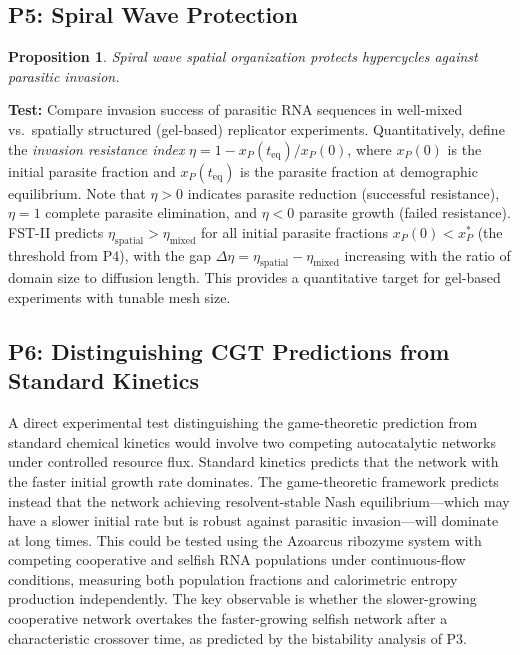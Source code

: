 \documentclass[12pt,a4paper]{article}
\newtheorem{proposition}{Proposition}
\theoremstyle{remark}
\begin{document}
\subsection{P5: Spiral Wave Protection}

\begin{proposition}
Spiral wave spatial organization protects hypercycles against parasitic invasion.
\end{proposition}

\textbf{Test:} Compare invasion success of parasitic RNA sequences in well-mixed vs.\ spatially structured (gel-based) replicator experiments. Quantitatively, define the \emph{invasion resistance index} $\eta = 1 - x_P(t_{\mathrm{eq}})/x_P(0)$, where $x_P(0)$ is the initial parasite fraction and $x_P(t_{\mathrm{eq}})$ is the parasite fraction at demographic equilibrium. Note that $\eta > 0$ indicates parasite reduction (successful resistance), $\eta = 1$ complete parasite elimination, and $\eta < 0$ parasite growth (failed resistance). FST-II predicts $\eta_{\mathrm{spatial}} > \eta_{\mathrm{mixed}}$ for all initial parasite fractions $x_P(0) < x_P^*$ (the threshold from P4), with the gap $\Delta\eta = \eta_{\mathrm{spatial}} - \eta_{\mathrm{mixed}}$ increasing with the ratio of domain size to diffusion length. This provides a quantitative target for gel-based experiments with tunable mesh size.

\subsection{P6: Distinguishing CGT Predictions from Standard Kinetics}

A direct experimental test distinguishing the game-theoretic prediction from standard chemical kinetics would involve two competing autocatalytic networks under controlled resource flux. Standard kinetics predicts that the network with the faster initial growth rate dominates. The game-theoretic framework predicts instead that the network achieving resolvent-stable Nash equilibrium---which may have a slower initial rate but is robust against parasitic invasion---will dominate at long times. This could be tested using the Azoarcus ribozyme system with competing cooperative and selfish RNA populations under continuous-flow conditions, measuring both population fractions and calorimetric entropy production independently. The key observable is whether the slower-growing cooperative network overtakes the faster-growing selfish network after a characteristic crossover time, as predicted by the bistability analysis of P3.
\end{document}
